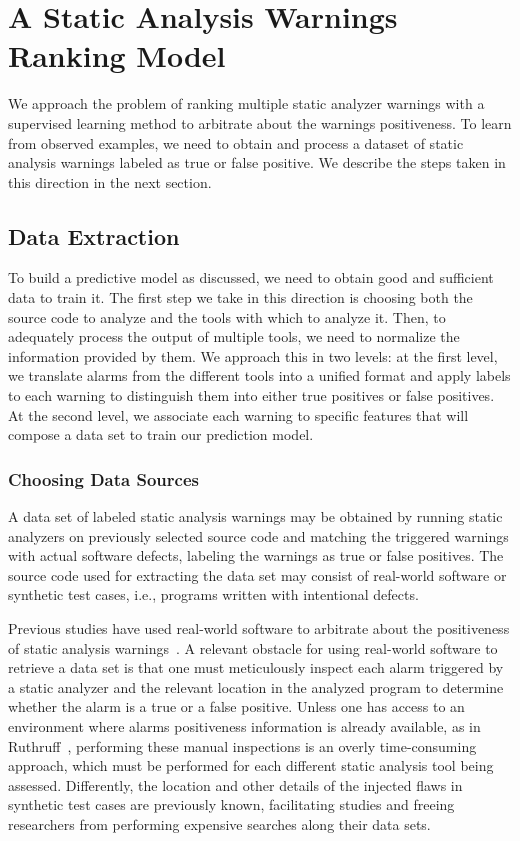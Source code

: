 \chapter{A Static Analysis Warnings Ranking Model}
\label{ch:ranking}

We approach the problem of ranking multiple static analyzer warnings with a
supervised learning method to arbitrate about the warnings positiveness. To
learn from observed examples, we need to obtain and process a dataset of static
analysis warnings labeled as true or false positive. We describe the steps taken
in this direction in the next section.

\section{Data Extraction}
\label{sec:data}

To build a predictive model as discussed, we need to obtain good and sufficient
data to train it. The first step we take in this direction is choosing both the
source code to analyze and the tools with which to analyze it. Then, to
adequately process the output of multiple tools, we need to normalize the
information provided by them. We approach this in two levels: at the first
level, we translate alarms from the different tools into a unified format and
apply labels to each warning to distinguish them into either true positives or
false positives. At the second level, we associate each warning to specific
features that will compose a data set to train our prediction model.

\subsection{Choosing Data Sources}

A data set of labeled static analysis warnings may be obtained by running
static analyzers on previously selected source code and matching the
triggered warnings with actual software defects, labeling the warnings as true
or false positives. The source code used for extracting the data set may
consist of real-world software or synthetic test cases, i.e., programs written
with intentional defects.

Previous studies have used real-world software to arbitrate about the
positiveness of static analysis warnings~\cite{kremenek2004correlation,
jung2005taming, yoon2014reducing, yuksel2013classification,
ruthruff_predicting_2008}. A relevant obstacle for using real-world software to
retrieve a data set is that one must meticulously inspect each alarm triggered
by a static analyzer and the relevant location in the analyzed program to
determine whether the alarm is a true or a false positive.  Unless one has
access to an environment where alarms positiveness information is already
available, as in Ruthruff~\cite{ruthruff_predicting_2008}, performing these
manual inspections is an overly time-consuming approach, which must be
performed for each different static analysis tool being assessed. Differently,
the location and other details of the injected flaws in synthetic test cases
are previously known, facilitating studies and freeing researchers from
performing expensive searches along their data sets.


